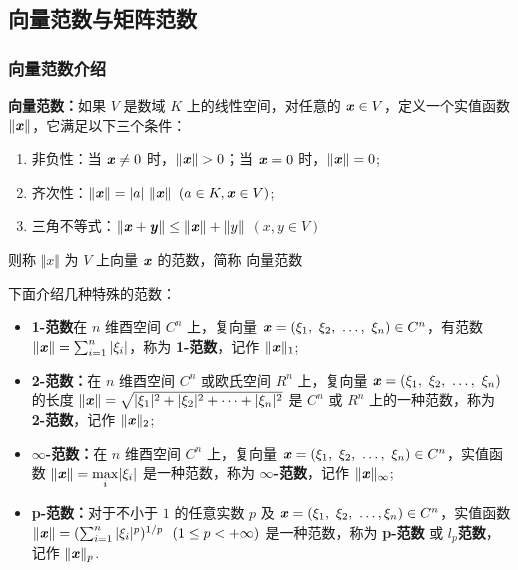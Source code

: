     \subsection{向量范数与矩阵范数}
        \subsubsection{向量范数介绍}
            \par \textbf{向量范数：}如果 $V$ 是数域 $K$ 上的线性空间，对任意的 $ \textbf{\textit{x}} \in V$，定义一个实值函数 $\Vert \textbf{\textit{x}} \Vert$，它满足以下三个条件：
            \begin{enumerate}
                \item 非负性：当 $\textbf{\textit{x}} \ne 0$ 时，$\Vert \textbf{\textit{x}} \Vert > 0$；当 $\textbf{\textit{x}} = 0$ 时，$\Vert \textbf{\textit{x}} \Vert = 0$;
                \item 齐次性：$\Vert \textbf{\textit{x}} \Vert = |a| \ \Vert \textbf{\textit{x}} \Vert$ $(a \in K, \textbf{\textit{x}} \in V)$;
                \item 三角不等式：$\Vert \textbf{\textit{x}} + \textbf{\textit{y}} \Vert \leq \Vert \textbf{\textit{x}} \Vert + \Vert y \Vert$ $(x, y \in V)$
            \end{enumerate}
            则称 $\Vert x \Vert$ 为 $V$ 上向量 $\textbf{\textit{x}}$ 的范数，简称 $\textbf{向量范数}$
            \\
            \par 下面介绍几种特殊的范数：
            \begin{itemize}
                \item \textbf{1-范数}在 $n$ 维酉空间 $C^n$ 上，复向量 $\textbf{\textit{x}} = (\xi_1, \ \xi_2, \ \dots, \ \xi_n) \in C^n$，有范数 $\Vert \textbf{\textit{x}} \Vert = \sum_{i=1}^{n}|\xi_i|$，称为 \textbf{1-范数}，记作 $\Vert \textbf{\textit{x}} \Vert_1$;
                \item \textbf{2-范数：}在 $n$ 维酉空间 $C^n$ 或欧氏空间 $R^n$ 上，复向量 $\textbf{\textit{x}} = (\xi_1, \ \xi_2, \ \dots, \ \xi_n)$ 的长度 $\Vert \textbf{\textit{x}} \Vert = \sqrt{|\xi_1|^2 + |\xi_2|^2 + \dots + |\xi_n|^2}$ 是 $C^n$ 或 $R^n$ 上的一种范数，称为 \textbf{2-范数}，记作 $\Vert \textbf{\textit{x}} \Vert_2$;
                \item \textbf{$\infty$-范数：}在 $n$ 维酉空间 $C^n$ 上，复向量 $\textbf{\textit{x}} = (\xi_1, \ \xi_2, \ \dots, \ \xi_n) \in C^n$，实值函数 $\Vert \textbf{\textit{x}} \Vert = \underset{i}\max |\xi_i|$ 是一种范数，称为 \textbf{$\infty$-范数}，记作 $\Vert \textbf{\textit{x}} \Vert_{\infty}$;
                \item \textbf{p-范数：}对于不小于 $1$ 的任意实数 $p$ 及 $\textbf{\textit{x}} = (\xi_1, \ \xi_2, \ \dots, \xi_n) \in C^n$，实值函数 $\Vert \textbf{\textit{x}} \Vert = (\sum_{i=1}^{n}|\xi_i|^p)^{1/p} \ \ (1 \leq p < +\infty)$ 是一种范数，称为 \textbf{p-范数} 或 \textbf{$l_p$范数}，记作 $\Vert \textbf{\textit{x}} \Vert_p$.
            \end{itemize}
